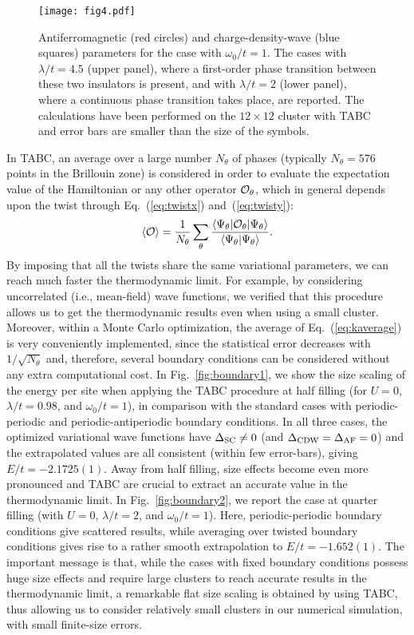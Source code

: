 \documentclass[aps,superscriptaddress,amsmath,amssymb,twocolumn,showpacs,floatfix,english]{revtex4}
\begin{document}
\begin{figure}
\texttt{[image: fig4.pdf]}
\caption{\label{fig:paramw1}
Antiferromagnetic (red circles) and charge-density-wave (blue squares) parameters for the case with $\omega_0/t=1$. The cases with 
$\lambda/t=4.5$ (upper panel), where a first-order phase transition between these two insulators is present, and with $\lambda/t=2$ (lower 
panel), where a continuous phase transition takes place, are reported. The calculations have been performed on the $12 \times 12$ cluster 
with TABC and error bars are smaller than the size of the symbols.}
\end{figure}

In TABC, an average over a large number $N_{\theta}$ of phases (typically $N_{\theta}=576$ points in the Brillouin zone) is considered 
in order to evaluate the expectation value of the Hamiltonian or any other operator ${\cal O}_{\theta}$, which in general depends upon 
the twist through Eq.~(\ref{eq:twistx}) and~(\ref{eq:twisty}):
\begin{equation}\label{eq:kaverage}
\langle {\cal O} \rangle = \frac{1}{N_{\theta}} \sum_{\theta} \frac{\langle \Psi_{\theta}| {\cal O}_{\theta} |\Psi_{\theta}\rangle}
{\langle \Psi_{\theta}|\Psi_{\theta}\rangle}.
\end{equation}
By imposing that all the twists share the same variational parameters, we can reach much faster the thermodynamic limit. For example,
by considering uncorrelated (i.e., mean-field) wave functions, we verified that this procedure allows us to get the thermodynamic results 
even when using a small cluster. Moreover, within a Monte Carlo optimization, the average of Eq.~(\ref{eq:kaverage}) is very conveniently 
implemented, since the statistical error decreases with $1/\sqrt{N_{\theta}}$ and, therefore, several boundary conditions can be considered 
without any extra computational cost. In Fig.~\ref{fig:boundary1}, we show the size scaling of the energy per site when applying the TABC 
procedure at half filling (for $U=0$, $\lambda/t=0.98$, and $\omega_0/t=1$), in comparison with the standard cases with periodic-periodic 
and periodic-antiperiodic boundary conditions. In all three cases, the optimized variational wave functions have $\Delta_{\rm SC} \ne 0$ 
(and $\Delta_{\rm CDW}=\Delta_{\rm AF}=0$) and the extrapolated values are all consistent (within few error-bars), giving $E/t=-2.1725(1)$. 
Away from half filling, size effects become even more pronounced and TABC are crucial to extract an accurate value in the thermodynamic limit. 
In Fig.~\ref{fig:boundary2}, we report the case at quarter filling (with $U=0$, $\lambda/t=2$, and $\omega_0/t=1$). Here, periodic-periodic 
boundary conditions give scattered results, while averaging over twisted boundary conditions gives rise to a rather smooth extrapolation to 
$E/t=-1.652(1)$. The important message is that, while the cases with fixed boundary conditions possess huge size effects and require large 
clusters to reach accurate results in the thermodynamic limit, a remarkable flat size scaling is obtained by using TABC, thus allowing us to 
consider relatively small clusters in our numerical simulation, with small finite-size errors.
\end{document}
